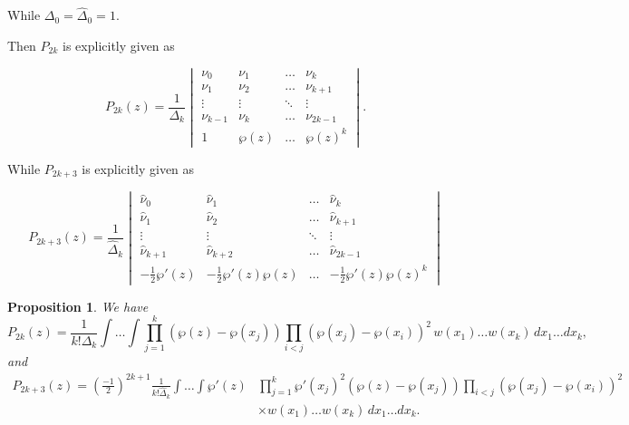 \documentclass[11pt,a4paper]{article}
\newtheorem{proposition}[theorem]{Proposition}
\theoremstyle{definition}
\numberwithin{equation}{section}
\numberwithin{theorem}{section}
\begin{document}
While $\Delta_0=\widehat{\Delta}_0=1$. 


Then $P_{2k}$ is explicitly given as 

\begin{equation}\label{detex}
    P_{2k}(z)=\frac{1}{\Delta_{k}}\begin{vmatrix}
        \nu_0&\nu_1&\dots &\nu_{k}\\
        \nu_1&\nu_2&\dots& \nu_{k+1}\\
        \vdots&\vdots&\ddots&\vdots\\
        \nu_{k-1}&\nu_{k}&\dots & \nu_{2k-1}\\
        1&\wp(z)&\dots &\wp(z)^k
    \end{vmatrix}.
\end{equation}

While $P_{2k+3}$ is explicitly given as 

\begin{equation}\label{detex2}
    P_{2k+3}(z)=\frac{1}{\widehat{\Delta}_{k}}\begin{vmatrix}
        \widehat{\nu}_0&\widehat{\nu}_1&\dots &\widehat{\nu}_{k}\\
        \widehat{\nu}_1&\widehat{\nu}_2&\dots&\widehat{\nu}_{k+1}\\
        \vdots&\vdots&\ddots&\vdots\\
        \widehat{\nu}_{k+1}&\widehat{\nu}_{k+2}&\dots &\widehat{\nu}_{2k-1}\\
        -\frac{1}{2}\wp'(z)& -\frac{1}{2}\wp'(z)\wp(z)&\dots & -\frac{1}{2}\wp'(z)\wp(z)^k
    \end{vmatrix}
\end{equation}
\begin{proposition}\label{heine-formula}
We have
\begin{equation}\label{heine1}
    P_{2k}(z) = \frac{1}{k! \Delta_{k}} \int \dots \int \prod_{j=1}^{k} (\wp(z) - \wp(x_j)) \prod_{i<j} (\wp(x_j) - \wp(x_i))^2\, w(x_1) \dots w(x_k)\, dx_1 \dots dx_k,
\end{equation}
and
\begin{equation}\label{heine2}
\begin{aligned}
    P_{2k+3}(z) = \left( \frac{-1}{2} \right)^{2k+1} \frac{1}{k! \widehat{\Delta}_{k}} \int \dots \int \wp'(z) &\prod_{j=1}^{k} \wp'(x_j)^2 (\wp(z) - \wp(x_j)) \prod_{i<j} (\wp(x_j) - \wp(x_i))^2\,\\&\times  w(x_1) \dots w(x_k)\, dx_1 \dots dx_k.
\end{aligned}
\end{equation}
\end{proposition}
\end{document}
